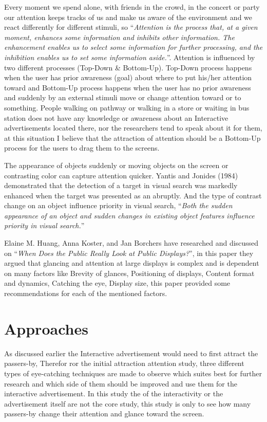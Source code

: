 Every moment we spend alone, with friends in the crowd, in the concert or party our attention keeps tracks of us and make us aware of the environment and we react differently for different stimuli, so ``\emph{Attention is the process that, at a given moment, enhances some information and inhibits other information. The enhancement enables us to select some information for further processing, and the inhibition enables us to set some information aside.}''\cite{Attention}. Attention is influenced by two different processes (Top-Down \& Bottom-Up). Top-Down process happens when the user has prior awareness (goal) about where to put his/her attention toward and Bottom-Up process happens when the user has no prior awareness and suddenly by an external stimuli move or change attention toward or to something. People walking on pathway or walking in a store or waiting in bus station does not have any knowledge or awareness about an Interactive advertisements located there, nor the researchers tend to speak about it for them, at this situation I believe that the attraction of attention should be a Bottom-Up process for the users to drag them to the screens.

The appearance of objects suddenly or moving objects on the screen or contrasting color can capture attention quicker. Yantis and Jonides (1984) demonstrated that the detection of a target in visual search was markedly enhanced when the target was presented as an abruptly\cite{capturingattention}. And the type of contrast change on an object influence priority in visual search, ``\emph{Both the sudden appearance of an object and sudden changes in existing object features influence priority in visual search.}''\cite{Luminance}

Elaine M. Huang, Anna Koster, and Jan Borchers have researched and discussed on ``\emph{When Does the Public Really Look at Public Displays?}''\cite{WhenPublicDisplays}, in this paper they argued that glancing and attention at large displays is complex and is dependent on many factors like Brevity of glances, Positioning of displays, Content format and dynamics, Catching the eye, Display size, this paper provided some recommendations for each of the mentioned factors.

\section{Approaches}
As discussed earlier the Interactive advertisement would need to first attract the passers-by, Therefor ror the initial attraction attention study, three different types of eye-catching techniques are made to observe which suites best for further research and which side of them should be improved and use them for the interactive advertisement. In this study the of the interactivity or the advertisement itself are not the core study, this study is only to see how many passers-by change their attention and glance toward the screen. 

